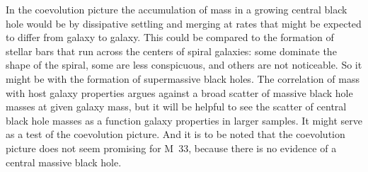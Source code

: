 \documentclass[fleqn,12pt]{article}
\begin{document}
In the coevolution picture the accumulation of mass in a growing central black hole would be by dissipative settling and merging at rates that might be expected to differ from galaxy to galaxy. This could be compared to the formation of stellar bars that run across the centers of spiral galaxies: some dominate the shape of the spiral, some are less conspicuous, and others are not noticeable. So it might be with the formation of supermassive black holes. The correlation of  mass with host galaxy properties argues against a broad scatter of massive black hole masses at given galaxy mass, but it will be helpful to see the scatter of central black hole masses as a function galaxy properties in larger samples. It might serve as a test of the coevolution picture. And it is to be noted that the coevolution picture does not seem promising for M~33, because there is no evidence of a central massive black hole.

\end{document}
